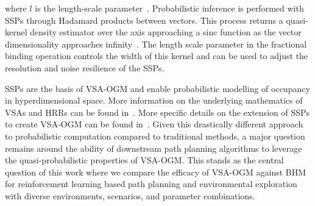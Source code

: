 where $l$ is the length-scale parameter~\cite{komer2020biologically}. Probabilistic inference is performed with SSPs through Hadamard products between vectors. This process returns a quasi-kernel density estimator over the axis approaching a sinc function as the vector dimensionality approaches infinity~\cite{furlong2022fractional}. The length scale parameter in the fractional binding operation controls the width of this kernel and can be used to adjust the resolution and noise resilience of the SSPs.

SSPs are the basis of VSA-OGM and enable probabilistic modelling of occupancy in hyperdimensional space. More information on the underlying mathematics of VSAs and HRRs can be found in~\cite{10.1016/0004-3702(90)90007-M, plate1991holographic, plate1994distributed, gayler2004vectorsymbolicarchitecturesanswer, eliasmith2013build}. More specific details on the extension of SSPs to create VSA-OGM can be found in~\cite{snyder2024brain}. Given this drastically different approach to probabilistic computation compared to traditional methods, a major question remains around the ability of downstream path planning algorithms to leverage the quasi-probabilistic properties of VSA-OGM. This stands as the central question of this work where we compare the efficacy of VSA-OGM against BHM for reinforcement learning based path planning and environmental exploration with diverse environments, scenarios, and parameter combinations.